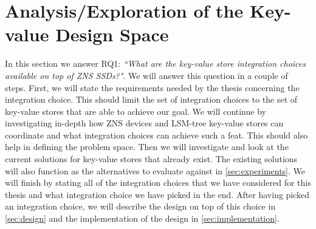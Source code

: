 \chapter{Analysis/Exploration of the Key-value Design Space}
\label{sec:approach}
In this section we answer RQ1: \textit{``What are the key-value store integration choices available on top of ZNS SSDs?"}. We will answer this question in a couple of steps. First, we will state the requirements needed by the thesis concerning the integration choice. This should limit the set of integration choices to the set of key-value stores that are able to achieve our goal. We will continue by investigating in-depth how ZNS devices and LSM-tree key-value stores can coordinate and what integration choices can achieve such a feat. This should also help in defining the problem space. Then we will investigate and look at the current solutions for key-value stores that already exist. The existing solutions will also function as the alternatives to evaluate against in \autoref{sec:experiments}. We will finish by stating all of the integration choices that we have considered for this thesis and what integration choice we have picked in the end. After having picked an integration choice, we will describe the design on top of this choice in \autoref{sec:design} and the implementation of the design in \autoref{sec:implementation}. 

